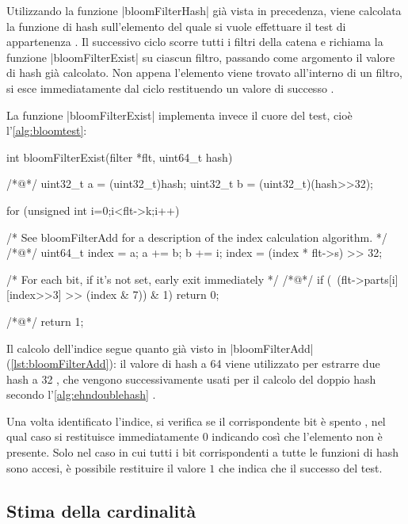 Utilizzando la funzione \cverb|bloomFilterHash| già vista in precedenza, viene calcolata la funzione
di hash sull'elemento del quale si vuole effettuare il test di appartenenza . Il successivo
ciclo  scorre tutti i filtri della catena e richiama la funzione \cverb|bloomFilterExist|
su ciascun filtro, passando come argomento il valore di hash già calcolato. Non appena l'elemento
viene trovato all'interno di un filtro, si esce immediatamente dal ciclo restituendo un valore di
successo .

La funzione \cverb|bloomFilterExist| implementa invece il cuore del test, cioè 
l'\autoref{alg:bloomtest}:

\begin{commentedsource}[style=csource,caption=Test di appartenenza di un elemento ad un filtro]
int bloomFilterExist(filter *flt, uint64_t hash) {
/*@\lnote@*/    uint32_t a = (uint32_t)hash;
    uint32_t b = (uint32_t)(hash>>32);

    for (unsigned int i=0;i<flt->k;i++) {
        /* See bloomFilterAdd for a description of the index calculation algorithm. */
/*@\lnote@*/        uint64_t index = a;
        a += b; b += i;
        index = (index * flt->s) >> 32;

        /* For each bit, if it's not set, early exit immediately */
/*@\lnote@*/        if (~(flt->parts[i][index>>3] >> (index & 7)) & 1)
            return 0;
    }
/*@\lnote@*/    return 1;
}
\end{commentedsource}

Il calcolo dell'indice segue quanto già visto in \cverb|bloomFilterAdd|
(\autoref{lst:bloomFilterAdd}): il valore di hash a \SI{64}{\bit} viene utilizzato per estrarre due
hash a \SI{32}{\bit} , che vengono successivamente usati per il calcolo del doppio hash
secondo l'\autoref{alg:ehndoublehash} .

Una volta identificato l'indice, si verifica se il corrispondente bit è spento , nel qual
caso si restituisce immediatamente $0$ indicando così che l'elemento non è presente. Solo nel caso
in cui tutti i bit corrispondenti a tutte le funzioni di hash sono accesi, è possibile restituire il
valore $1$  che indica che il successo del test.

\subsection{Stima della cardinalità}
\label{sec:patch:card}

